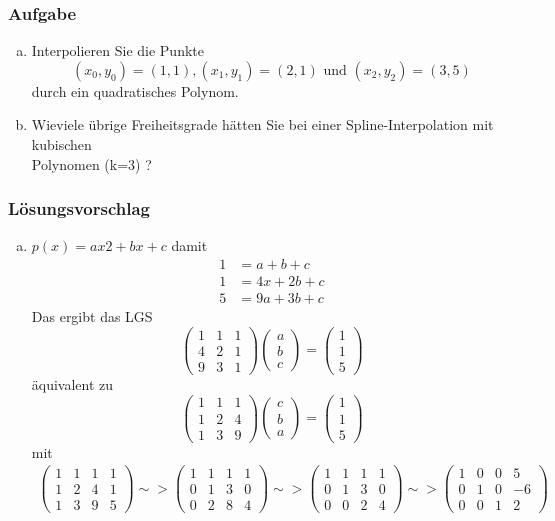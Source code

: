 \documentclass[a4paper,11pt]{scrartcl}
\newcounter{auf}
\newcommand{\Aufgabe}%
        {\addtocounter{auf}{1} \subsubsection*{\rmfamily  Aufgabe \theauf \hspace{1em}} }
\begin{document}
\newpage
\Aufgabe
\begin{enumerate}[a)]
\item
Interpolieren Sie die Punkte
$$
(x_0,y_0)=(1,1), (x_1,y_1)=(2,1) \text{ und } (x_2,y_2)=(3,5)
$$
durch ein quadratisches Polynom.
\item Wieviele übrige Freiheitsgrade hätten Sie bei einer Spline-Interpolation mit kubischen \\Polynomen (k=3) ?
\end{enumerate}
%
%
\subsubsection*{Lösungsvorschlag}
\begin{enumerate}[a)]
\item
$p(x)=ax2+bx+c$ damit
\begin{align*}
1&=a+b+c\\
1&=4x+2b+c\\
5&=9a+3b+c
\end{align*}
Das ergibt das LGS
$$
\begin{pmatrix} 1&1&1 \\ 4 & 2 & 1\\ 9&3&1 \end{pmatrix}\begin{pmatrix}a\\b\\c\end{pmatrix}=\begin{pmatrix} 1\\1\\5 \end{pmatrix}
$$
äquivalent zu
$$
\begin{pmatrix} 1&1&1 \\ 1&2&4\\ 1&3&9 \end{pmatrix}\begin{pmatrix}c\\b\\a\end{pmatrix}=\begin{pmatrix} 1\\1\\5 \end{pmatrix}
$$
mit 
\begin{align*}
\left( \begin{array}{ccc|c} 1&1&1&1\\ 1&2&4&1\\1&3&9&5 \end{array}\right) \sim> \left( \begin{array}{ccc|c} 1&1&1&1\\ 0&1&3&0\\0&2&8&4 \end{array} \right) \sim> \left( \begin{array}{ccc|c} 1&1&1&1\\ 0&1&3&0\\0&0&2&4 \end{array} \right) \sim> \left( \begin{array}{ccc|c} 1&0&0&5\\ 0&1&0&-6\\0&0&1&2 \end{array} \right)

\end{align*}
\end{enumerate}
\end{document}
